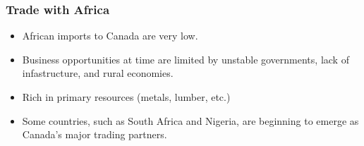 \subsubsection{Trade with Africa}

\begin{itemize}
    \item African imports to Canada are very low.
    \item Business opportunities at time are limited by unstable governments, lack of infastructure, and rural economies.
    \item Rich in primary resources (metals, lumber, etc.)
    \item Some countries, such as South Africa and Nigeria, are beginning to emerge as Canada's major trading partners.
\end{itemize}

\pagebreak